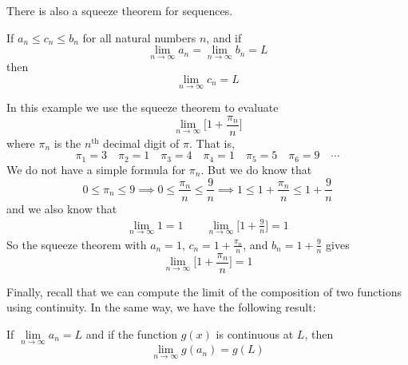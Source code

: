 There is also a squeeze theorem for sequences.

\begin{theorem}\label{thm:SRsqueeze}
If $a_n\le c_n\le b_n$ for all natural numbers $n$, and if
\begin{equation*}
\lim_{n\rightarrow\infty}a_n=\lim_{n\rightarrow\infty}b_n=L
\end{equation*}
then\begin{equation*}
\lim_{n\rightarrow\infty}c_n=L
\end{equation*}
\end{theorem}

\begin{eg}\label{eg:SRsqueeze}
In this example we use the squeeze theorem to evaluate
\begin{equation*}
\lim_{n\rightarrow\infty}\Big[1+\frac{\pi_n}{n}\Big]
\end{equation*}
where $\pi_n$ is the $n^{\mathrm{th}}$ decimal digit of $\pi$.
That is,
\begin{equation*}
\pi_1=3\quad \pi_2=1 \quad \pi_3=4 \quad \pi_4=1 \quad \pi_5=5
\quad\pi_6=9\quad\cdots
\end{equation*}
We do not have a simple formula for $\pi_n$. But we do know that
\begin{equation*}
0\le\pi_n\le 9
\implies 0 \le \frac{\pi_n}{n} \le \frac{9}{n}
\implies 1 \le 1+\frac{\pi_n}{n} \le 1+\frac{9}{n}
\end{equation*}
and we also know that
\begin{align*}
\lim_{n\rightarrow\infty} 1 = 1\qquad
\lim_{n\rightarrow\infty} \Big[1+\frac{9}{n}\Big] = 1
\end{align*}
So the squeeze theorem with $a_n=1$, $c_n=1+\frac{\pi_n}{n}$,
and $b_n=1+\frac{9}{n}$ gives
\begin{equation*}
\lim_{n\rightarrow\infty}\Big[1+\frac{\pi_n}{n}\Big] = 1
\end{equation*}
\end{eg}

Finally, recall that we can compute the limit of the composition
of two functions using continuity. In the same
way, we have the following result:
\begin{theorem}\label{thm:SRcontfn}
If
$\lim\limits_{n\rightarrow\infty}a_n=L
$
and if the function $g(x)$ is continuous at $L$, then
\begin{equation*}
\lim_{n\rightarrow\infty}g(a_n)=g(L)
\end{equation*}
\end{theorem}

